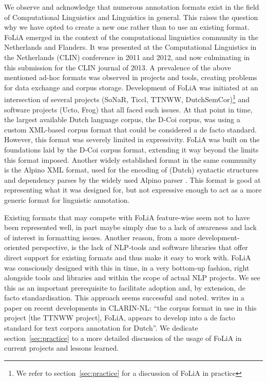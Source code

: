 \documentclass[a4paper,10pt,twoside]{article}
\begin{document}
We observe and acknowledge that numerous annotation formats exist in the field
of Computational Linguistics and Linguistics in general. This raises the
question why we have opted to create a new one rather than to use an existing format. FoLiA
emerged in the context of the computational linguistics community in the
Netherlands and Flanders. It was presented at the Computational Linguistics in
the Netherlands (CLIN) conference in 2011 and 2012, and now culminating in this
submission for the CLIN journal of 2013. A prevalence of the above mentioned
ad-hoc formats was observed in projects and tools, creating problems for data
exchange and corpus storage. Development of FoLiA was initiated at an
intersection of several projects (SoNaR, Ticcl, TTNWW, DutchSemCor)\footnote{We
refer to section~\ref{sec:practice} for a discussion of FoLiA in practice} and
software projects (Ucto, Frog) that all faced such issues. At that point in
time, the largest available Dutch language corpus, the D-Coi corpus, was using
a custom XML-based corpus format \cite{DCOI} that could be considered a
de facto standard. However, this format was severely limited in expressivity.
FoLiA was built on the foundations laid by the D-Coi corpus format, extending
it way beyond the limits this format imposed. Another widely established
format in the same community is the Alpino XML format, used for the encoding of
(Dutch) syntactic structures and dependency parses by the widely used Alpino
parser \cite{ALPINO}. This format is good at representing what it was
designed for, but not expressive enough to act as a more generic format for
linguistic annotation.

Existing formats that may compete with FoLiA feature-wise seem not to have been
represented well, in part maybe simply due to a lack of awareness and lack of interest in
formatting issues. Another reason, from a more development-oriented
perspective, is the lack of NLP-tools and software libraries that offer direct
support for existing formats and thus make it easy to work with. FoLiA was
consciously designed with this in time, in a very
bottom-up fashion, right alongside tools and libraries and within the scope of
actual NLP projects. We see this as an important prerequisite to facilitate
adoption and, by extension, de facto standardisation. This approach seems
successful and noted.  writes in a paper on recent developments
in CLARIN-NL: ``the corpus format in use in this project [the TTNWW project],
FoLiA, appears to develop into a de facto standard for text corpora annotation
for Dutch''. We dedicate section~\ref{sec:practice} to a more detailed
discussion of the usage of FoLiA in current projects and lessons learned.
\end{document}
